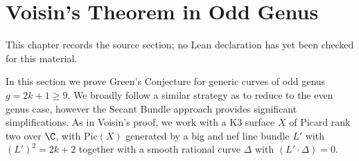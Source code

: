 \chapter{Voisin's Theorem in Odd Genus}
\label{universal-secant-bundles-syzygies-canonical-curves-chapter-04}

\begin{remark}
\label{universal-secant-bundles-syzygies-canonical-curves-chapter-04-source}
This chapter records the source section; no Lean declaration has yet been checked for this material.
\notready
\end{remark}

\label{odd-genus}
In this section we prove Green's Conjecture for generic curves of odd genus $g=2k+1 \geq 9$. We broadly follow a similar strategy as \cite{V2} to reduce to the even genus case, however the Secant Bundle approach provides significant simplifications. As in Voisin's proof, we work with a K3 surface $X$ of Picard rank two over $\C$, with $\text{Pic}(X)$ generated by a big and nef line bundle $L'$ with $(L')^2=2k+2$ together with a smooth rational curve $\Delta$ with $(L' \cdot \Delta)=0$.


